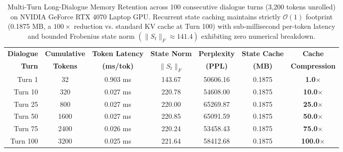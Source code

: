 \documentclass[journal]{IEEEtran}
\begin{document}
\begin{table}[t]
\centering
\caption{Multi-Turn Long-Dialogue Memory Retention across 100 consecutive dialogue turns (3,200 tokens unrolled) on NVIDIA GeForce RTX 4070 Laptop GPU. Recurrent state caching maintains strictly $\mathcal{O}(1)$ footprint (0.1875 MB, a $100\times$ reduction vs. standard KV cache at Turn 100) with sub-millisecond per-token latency and bounded Frobenius state norm $(\|S_t\|_F \approx 141.4)$ exhibiting zero numerical breakdown.}
\label{tab:multiturn_dialogue}
\small
\begin{tabular}{rcccccc}
\toprule
\textbf{Dialogue} & \textbf{Cumulative} & \textbf{Token Latency} & \textbf{State Norm} & \textbf{Perplexity} & \textbf{State Cache} & \textbf{Cache} \\
\textbf{Turn} & \textbf{Tokens} & \textbf{(ms/tok)} & \textbf{$\|S_t\|_F$} & \textbf{(PPL)} & \textbf{(MB)} & \textbf{Compression} \\
\midrule
Turn 1 & 32 & 0.903 ms & 143.67 & 50606.16 & 0.1875 & \textbf{1.0}$\times$ \\
Turn 10 & 320 & 0.027 ms & 220.78 & 54608.00 & 0.1875 & \textbf{10.0}$\times$ \\
Turn 25 & 800 & 0.027 ms & 220.00 & 65269.87 & 0.1875 & \textbf{25.0}$\times$ \\
Turn 50 & 1600 & 0.027 ms & 220.85 & 65091.59 & 0.1875 & \textbf{50.0}$\times$ \\
Turn 75 & 2400 & 0.026 ms & 220.24 & 53458.43 & 0.1875 & \textbf{75.0}$\times$ \\
Turn 100 & 3200 & 0.025 ms & 221.64 & 58412.68 & 0.1875 & \textbf{100.0}$\times$ \\
\bottomrule
\end{tabular}
\end{table}

\end{document}
